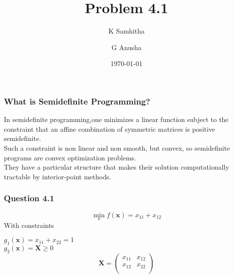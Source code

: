 \documentclass{beamer}
\title[]{Problem 4.1} %
\author[K Samhitha , G Anusha] %
{K Samhitha\inst{1} \and G Anusha\inst{2}}
\institute[IITH] %
{
  \inst{1}%
  EE16BTECH11019\\
  \and
  \inst{2}%
  EE16BTECH11011\\
  }
\date{\today} %
\begin{document}
\begin{frame}
\titlepage %
\end{frame}





\begin{frame}
\frametitle{What is Semidefinite Programming?}
In semidefinite programming,one minimizes a linear function subject to the constraint that an affine combination of symmetric matrices is positive semidefinite.\\
Such a constraint is non linear and non smooth, but convex, so semidefinite programs are convex optimization problems.\\
They have a particular structure that makes their solution computationally tractable by interior-point methods.\\



\end{frame}

\begin{frame}
\frametitle{Question 4.1}
\begin{equation*}
    \min_{x} f(\textbf{x}) = x_{11} + x_{12}
\end{equation*}
With constraints\\

\begin{center}
$g_1(\textbf{x}) = x_{11} + x_{22} = 1$\\
$g_2(\textbf{x}) = \textbf{X} \geq 0$\\
$$
\textbf{X} = \begin{pmatrix}
x_{11}&x_{12}\\
x_{12}&x_{22}\\
\end{pmatrix}
$$
\end{center}

\end{frame}




\end{document}

